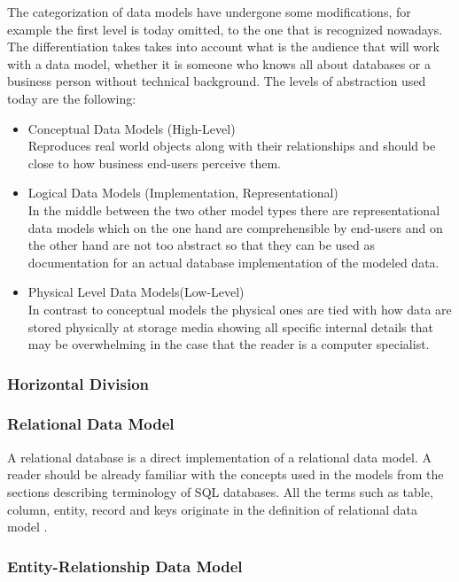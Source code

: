The categorization of data models have undergone some modifications, for example the first level is today omitted, to the one that is recognized nowadays. The differentiation takes takes into account  what is the audience that will work with a data model, whether it is someone who knows all about databases or a business person without technical background. The levels of abstraction used today\cite{SilberschatzKorthSudarshan10} are the following: 
\begin{itemize}
	\item Conceptual Data Models (High-Level) \\
	Reproduces real world objects along with their relationships and should be close to how business end-users perceive them.
	
	\item Logical Data Models (Implementation, Representational) \\
	In the middle between the two other model types there are representational data models which on the one hand are comprehensible by end-users and on the other hand are not too abstract so that they can be used as documentation for an actual database implementation of the modeled data.
	
	\item Physical Level Data Models(Low-Level) \\
	In contrast to conceptual models the physical ones are tied with how data are stored physically at storage media showing all specific internal details that may be overwhelming in the case that the reader is a computer specialist.
\end{itemize}


\subsubsection{Horizontal Division}

\subsubsection{Relational Data Model}

A relational database is a direct implementation of a relational data model. A reader should be already familiar with the concepts used in the models from the sections describing terminology of SQL databases. All the terms such as table, column, entity, record and keys originate in the definition of relational data model \cite{Codd69}.

\subsubsection{Entity-Relationship Data Model}

